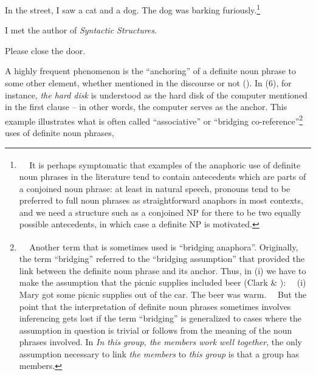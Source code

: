 \begin{listWWNumileveli}
\item {}

\begin{styleExample}
\label{bkm:Ref93745057}In the street, I saw a cat and a dog. The dog was barking furiously.\footnote{\textsuperscript{\ \ } It is perhaps symptomatic that examples of the anaphoric use of definite noun phrases in the literature tend to contain antecedents which are parts of a conjoined noun phrase: at least in natural speech, pronouns tend to be preferred to full noun phrases as straightforward anaphors in most contexts, and we need a structure such as a conjoined NP for there to be two equally possible antecedents, in which case a definite NP is motivated.}

\end{styleExample}

\item {}

\begin{styleExample}
\label{bkm:Ref93745078}I met the author of \textit{Syntactic Structures}. 

\end{styleExample}

\item {}

\begin{styleExample}
\label{bkm:Ref93745091}Please close the door.

\end{styleExample}

\end{listWWNumileveli}

\begin{styleBodyTextFirst}
A highly frequent phenomenon is the “anchoring” of a definite noun phrase to some other element, whether mentioned in the discourse or not (\citet[25]{Fraurud1992}). In (6), for instance, \textit{the hard disk} is understood as the hard disk of the computer mentioned in the first clause – in other words, the computer serves as the anchor.  This example illustrates what is often called “associative” or “bridging co-reference”\footnote{\textsuperscript{\ \ } Another term that is sometimes used is “bridging anaphora”. Originally, the term “bridging” referred to the “bridging assumption” that provided the link between the definite noun phrase and its anchor. Thus, in (i) we have to make the assumption that the picnic supplies included beer (Clark \& \citet{Haviland1974}):
\ \ (i) Mary got some picnic supplies out of the car. The beer was warm. 
\ \ But the point that the interpretation of definite noun phrases sometimes involves inferencing gets lost if the term “bridging” is generalized to cases where the assumption in question is trivial or follows from the meaning of the noun phrases involved. In \textit{In this group, the members work well together}, the only assumption necessary to link \textit{the members} to \textit{this group} is that a group has members. } uses of definite noun phrases,

\end{styleBodyTextFirst}

